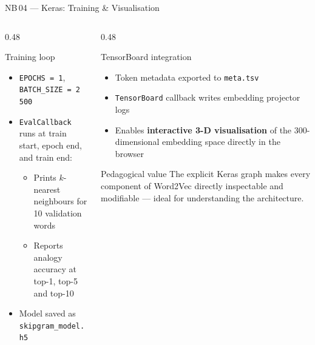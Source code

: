 \documentclass[11pt,aspectratio=169,professionalfonts]{beamer}
\begin{document}
\begin{frame}{NB\,04 — Keras: Training \& Visualisation}

  \begin{columns}[T]
    \begin{column}{0.48\textwidth}
      \begin{block}{Training loop}
        \begin{itemize}
          \item \texttt{EPOCHS = 1},
                \texttt{BATCH\_SIZE = 2\,500}
          \item \texttt{EvalCallback} runs at train start,
                epoch end, and train end:
                \begin{itemize}
                  \item Prints $k$-nearest neighbours for
                        10 validation words
                  \item Reports analogy accuracy at
                        top-1, top-5 and top-10
                \end{itemize}
          \item Model saved as \texttt{skipgram\_model.h5}
        \end{itemize}
      \end{block}
    \end{column}
    \begin{column}{0.48\textwidth}
      \begin{block}{TensorBoard integration}
        \begin{itemize}
          \item Token metadata exported to
                \texttt{meta.tsv}
          \item \texttt{TensorBoard} callback writes
                embedding projector logs
          \item Enables \textbf{interactive 3-D
                visualisation} of the 300-dimensional
                embedding space directly in the browser
        \end{itemize}
      \end{block}
      \begin{alertblock}{Pedagogical value}
        The explicit Keras graph makes every component
        of Word2Vec directly inspectable and modifiable
        — ideal for understanding the architecture.
      \end{alertblock}
    \end{column}
  \end{columns}

\end{frame}
\end{document}
